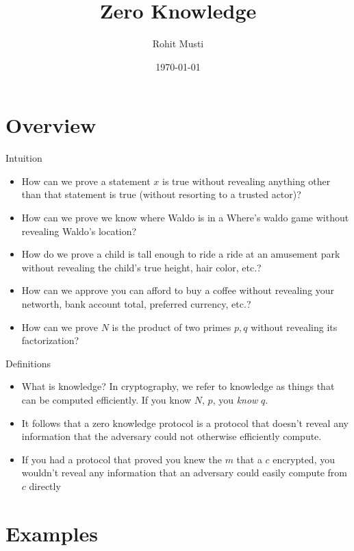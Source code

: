 \documentclass[handout]{beamer}
\title{Zero Knowledge}
\author{Rohit Musti}
\institute{CUNY - Hunter College}
\date{\today}
\begin{document}
 
\frame{\titlepage}

\section{Overview}

\begin{frame}{Intuition}
    \begin{itemize}
        \item \pause How can we prove a statement \(x\) is true without revealing anything other than that statement is true (without resorting to a trusted actor)?
        \item \pause How can we prove we know where Waldo is in a Where's waldo game without revealing Waldo's location?
        \item \pause How do we prove a child is tall enough to ride a ride at an amusement park without revealing the child's true height, hair color, etc.?
        \item \pause How can we approve you can afford to buy a coffee without revealing your networth, bank account total, preferred currency, etc.?
        \item \pause How can we prove \(N\) is the product of two primes \(p, q\) without revealing its factorization?
    \end{itemize}
\end{frame}

\begin{frame}{Definitions}
    \begin{itemize}
        \item \pause What is knowledge? In cryptography, we refer to knowledge as things that can be computed efficiently. \pause If you know \(N\), \(p\), you \textit{know} \(q\).
        \item \pause It follows that a zero knowledge protocol is a protocol that doesn't reveal any information that the adversary could not otherwise efficiently compute. 
        \item \pause If you had a protocol that proved you knew the \(m\) that a \(c\) encrypted, you wouldn't reveal any information that an adversary could easily compute from \(c\) directly
    \end{itemize}
\end{frame}

\section{Examples}
\end{document}

